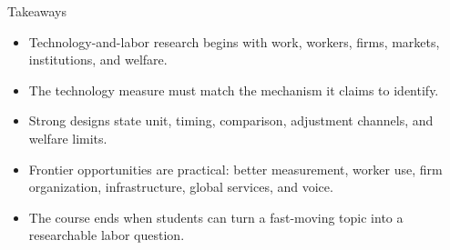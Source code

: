 \documentclass[aspectratio=169,11pt]{beamer}
\begin{document}
\begin{frame}{Takeaways}
\begin{itemize}
    \item Technology-and-labor research begins with work, workers, firms, markets, institutions, and welfare.
    \item The technology measure must match the mechanism it claims to identify.
    \item Strong designs state unit, timing, comparison, adjustment channels, and welfare limits.
    \item Frontier opportunities are practical: better measurement, worker use, firm organization, infrastructure, global services, and voice.
    \item The course ends when students can turn a fast-moving topic into a researchable labor question.
\end{itemize}
\end{frame}
\end{document}
